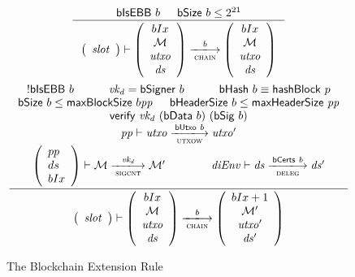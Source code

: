 \documentclass[11pt,a4paper]{article}
\newcommand{\var}[1]{\mathit{#1}}
\newcommand{\fun}[1]{\mathsf{#1}}
\newcommand{\trans}[2]{\xlongrightarrow[\textsc{#1}]{#2}}
\newcommand{\hashname}{bHash}
\newcommand{\bsizename}{bSize}
\newcommand{\bhdrsizename}{bHeaderSize}
\newcommand{\verifyname}{verify}
\newcommand{\signmapname}{\mathcal{M}}
\newcommand{\hashofblockname}{hashBlock}
\newcommand{\maxblocksizename}{maxBlockSize}
\newcommand{\maxheadersizename}{maxHeaderSize}
\newcommand{\isebbname}{bIsEBB}
\newcommand{\bdataname}{bData}
\newcommand{\bcertsname}{bCerts}
\newcommand{\bsigname}{bSig}
\newcommand{\bsignername}{bSigner}
\newcommand{\verify}[3]{\fun{\verifyname} ~ #1 ~ #2 ~ #3}
\newcommand{\hash}[1]{\fun{\hashname}\ #1}
\newcommand{\bsize}[1]{\fun{\bsizename} ~ #1}
\newcommand{\bhdrsize}[1]{\fun{\bhdrsizename} ~ #1}
\newcommand{\hashofblock}[1]{\fun{\hashofblockname} ~ #1}
\newcommand{\maxblocksize}[1]{\fun{\maxblocksizename} ~ #1}
\newcommand{\maxheadersize}[1]{\fun{\maxheadersizename} ~ #1}
\newcommand{\isebb}[1]{\fun{\isebbname} ~ #1}
\newcommand{\bdata}[1]{\fun{\bdataname} ~ #1}
\newcommand{\bcerts}[1]{\fun{\bcertsname} ~ #1}
\newcommand{\bsig}[1]{\fun{\bsigname} ~ #1}
\newcommand{\bsigner}[1]{\fun{\bsignername} ~ #1}
\begin{document}
\begin{figure}
  \begin{equation*}
  \inference
  { \isebb{b} & \bsize{b} \leq 2^{21} }
  {
    \left(
      {\begin{array}{c}
         \var{slot}
       \end{array}}
    \right)
    \vdash
    \left(
      {\begin{array}{c}
         bIx \\
         \signmapname \\
         \var{utxo} \\
         \var{ds}
       \end{array}}
    \right)
    \trans{chain}{b}
    \left(
      {\begin{array}{c}
         bIx \\
         \signmapname \\
         \var{utxo} \\
         \var{ds}
       \end{array}}
    \right)
  }
  \end{equation*}
  \vspace{20pt}
  \begin{equation*}
  \inference
  {
    !\isebb{b} &
    \var{vk_d} = \bsigner{b} & \hash{b} \equiv \hashofblock{p} \\
    \bsize{b} \leq \maxblocksize{b}{\var{pp}} & \bhdrsize{b} \leq \maxheadersize{\var{pp}} \\
    \verify{\var{vk_d}}{(\bdata{b})}{(\bsig{b})} \\
    \var{pp} \vdash \var{utxo} \trans{utxow}{\butxo{b}} \var{utxo'} \\
    {\left(
      \begin{array}{l}
        pp \\
        ds \\
        bIx
      \end{array}
    \right)}
    \vdash
    \signmapname \trans{sigcnt}{\var{vk_d}} \signmapname' &&
    \var{diEnv} \vdash \var{ds} \trans{deleg}{\bcerts{b}} \var{ds'}
  }
  {
    \left(
      {\begin{array}{c}
         \var{slot}
       \end{array}}
    \right)
    \vdash
    \left(
      {\begin{array}{c}
         bIx \\
         \signmapname \\
         \var{utxo} \\
         \var{ds}
       \end{array}}
    \right)
    \trans{chain}{b}
    \left(
      {\begin{array}{c}
         bIx + 1 \\
         \signmapname' \\
         \var{utxo}' \\
         \var{ds'}
       \end{array}}
    \right)
  }
  \end{equation*}
  \caption{The Blockchain Extension Rule}
  \label{fig:blockchain-extension}
\end{figure}
\clearpage


\end{document}
